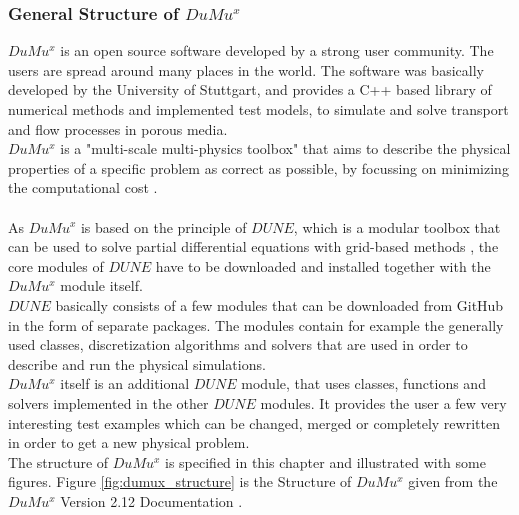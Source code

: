 \newpage
\subsubsection{General Structure of $DuMu^x$}

$DuMu^x$ is an open source software developed by a strong user community. The users are spread around many places in the world. The software was basically developed by the University of Stuttgart, and provides a C++ based library of numerical methods and implemented test models, to simulate and solve transport and flow processes in porous media.
\\$DuMu^x$ is a "multi-scale multi-physics toolbox" that aims to describe the physical properties of a specific problem as correct as possible, by focussing on minimizing the computational cost  \cite{flemisch2007dumux}.\\
\\As $DuMu^x$ is based on the principle of $DUNE$, which is a modular toolbox that can be used to solve partial differential equations with grid-based methods \cite{flemischdumux}, the core modules of $DUNE$ have to be downloaded and installed together with the $DuMu^x$ module itself.
\\$DUNE$ basically consists of a few modules that can be downloaded from GitHub in the form of separate packages. The modules contain for example the generally used classes, discretization algorithms and solvers that are used in order to describe and run the physical simulations.
\\$DuMu^x$ itself is an additional $DUNE$ module, that uses classes, functions and solvers implemented in the other $DUNE$ modules. It provides the user a few very interesting test examples which can be changed, merged or completely rewritten in order to get a new physical problem.
\\The structure of $DuMu^x$ is specified in this chapter and illustrated with some figures.
Figure \ref{fig:dumux_structure}  is the Structure of $DuMu^x$ given from the $DuMu^x$ Version 2.12 Documentation \cite{flemischdumux}.\\
\\
